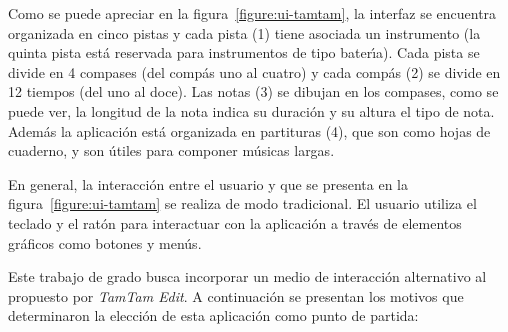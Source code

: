 Como se puede apreciar en la figura~\ref{figure:ui-tamtam}, la interfaz se encuentra organizada en 
cinco pistas y cada pista (1) tiene asociada un instrumento (la quinta pista est\'a reservada para
instrumentos de tipo bater{\'\i}a). Cada pista se divide en 4 
compases (del comp\'as uno al cuatro) y cada comp\'as (2) se divide en 12 tiempos (del uno al doce). 
Las notas (3) se dibujan en los compases, como se puede ver, la longitud de la nota indica su 
duraci\'on y su altura el tipo de nota. Adem\'as la aplicaci\'on est\'a organizada en partituras (4), que 
son como hojas de cuaderno, y son \'utiles para componer m\'usicas largas.

En general, la interacci\'on entre el usuario y  que se presenta en
la figura~\ref{figure:ui-tamtam} se realiza de modo tradicional.
El usuario utiliza el teclado y el rat\'on para interactuar con la aplicaci\'on a trav\'es de elementos
gr\'aficos como botones y men\'us. 

Este trabajo de grado busca incorporar un medio de interacci\'on alternativo al propuesto por \emph{TamTam Edit}. 
A continuaci\'on se presentan los motivos que determinaron la elecci\'on de esta aplicaci\'on como punto de partida:

